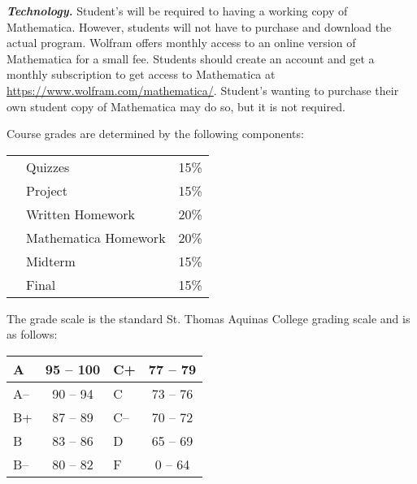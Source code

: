 \documentclass[11pt,letterpaper]{article}
\begin{document}
{\itshape\bfseries\color{stacred}Technology.} Student's will be required to having a working copy of Mathematica. However, students will not have to purchase and download the actual program. Wolfram offers monthly access to an online version of Mathematica for a small fee. Students should create an account and get a monthly subscription to get access to Mathematica at \href{https://www.wolfram.com/mathematica/}{https://www.wolfram.com/mathematica/}. Student's wanting to purchase their own student copy of Mathematica may do so, but it is not required.  
\sectionbreak









Course grades are determined by the following components: \par
	\begin{table}[!ht]
        \begin{tabular}{clr}
        & Quizzes & 15\% \\
        & Project & 15\% \\
        & Written Homework & 20\% \\
        & Mathematica Homework & 20\% \\
        & Midterm & 15\% \\
        & Final & 15\%
        \end{tabular} 
        \end{table}
\pspace



The grade scale is the standard St. Thomas Aquinas College grading scale and is as follows: \par
        \begin{table}[!ht]
        \centering
        \begin{tabular}{|l||c|l||c|} \hline
        A & 95 -- 100 & C+ & 77 -- 79 \\ \hline
        A-- & 90 -- 94 & C & 73 -- 76 \\ \hline
        B+ & 87 -- 89 & C-- & 70 -- 72 \\ \hline
        B & 83 -- 86 & D & 65 -- 69 \\ \hline
        B-- & 80 -- 82 & F & 0 -- 64 \\ \hline
        \end{tabular}
        \end{table} \pspace
\end{document}
